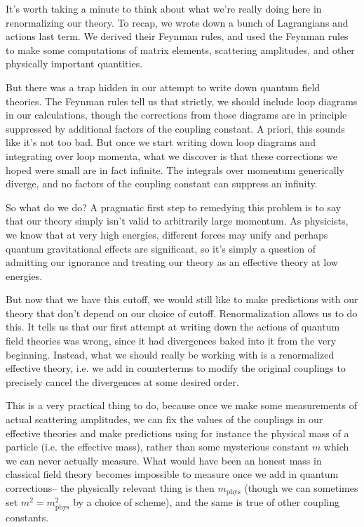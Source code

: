 It's worth taking a minute to think about what we're really doing here in renormalizing our theory. To recap, we wrote down a bunch of Lagrangians and actions last term. We derived their Feynman rules, and used the Feynman rules to make some computations of matrix elements, scattering amplitudes, and other physically important quantities.

But there was a trap hidden in our attempt to write down quantum field theories. The Feynman rules tell us that strictly, we should include loop diagrams in our calculations, though the corrections from those diagrams are in principle suppressed by additional factors of the coupling constant. A priori, this sounds like it's not too bad. But once we start writing down loop diagrams and integrating over loop momenta, what we discover is that these corrections we hoped were small are in fact infinite. The integrals over momentum generically diverge, and no factors of the coupling constant can suppress an infinity.

So what do we do? A pragmatic first step to remedying this problem is to say that our theory simply isn't valid to arbitrarily large momentum. As physicists, we know that at very high energies, different forces may unify and perhaps quantum gravitational effects are significant, so it's simply a question of admitting our ignorance and treating our theory as an effective theory at low energies.

But now that we have this cutoff, we would still like to make predictions with our theory that don't depend on our choice of cutoff. Renormalization allows us to do this. It tells us that our first attempt at writing down the actions of quantum field theories was wrong, since it had divergences baked into it from the very beginning. Instead, what we should really be working with is a renormalized effective theory, i.e. we add in counterterms to modify the original couplings to precisely cancel the divergences at some desired order.

This is a very practical thing to do, because once we make some measurements of actual scattering amplitudes, we can fix the values of the couplings in our effective theories and make predictions using for instance the physical mass of a particle (i.e. the effective mass), rather than some mysterious constant $m$ which we can never actually measure. What would have been an honest mass in classical field theory becomes impossible to measure once we add in quantum corrections-- the physically relevant thing is then $m_{\text{phys}}$ (though we can sometimes set $m^2=m_{\text{phys}}^2$ by a choice of scheme), and the same is true of other coupling constants.